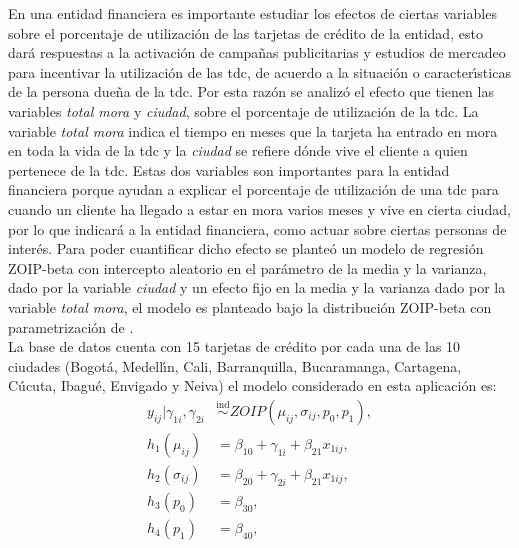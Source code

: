 En una entidad financiera es importante estudiar los efectos de ciertas variables sobre el porcentaje de utilizaci\'{o}n de las tarjetas de cr\'{e}dito de la entidad, esto dar\'{a} respuestas a la activaci\'{o}n de campa\~{n}as publicitarias y estudios de mercadeo para incentivar la utilizaci\'{o}n de las tdc, de acuerdo a la situaci\'{o}n o caracter\'{\i}sticas de la persona due\~{n}a de la tdc. Por esta raz\'{o}n se analiz\'{o} el efecto que tienen las variables \textsl{total mora} y \textsl{ciudad}, sobre el porcentaje de utilizaci\'{o}n de la tdc. La variable \textsl{total mora} indica el tiempo en meses que la tarjeta ha entrado en mora en toda la vida de la tdc y la \textsl{ciudad} se refiere d\'{o}nde vive el cliente a quien pertenece de la tdc. Estas dos variables son importantes para la entidad financiera porque ayudan a explicar el porcentaje de utilizaci\'{o}n de una tdc para cuando un cliente ha llegado a estar en mora varios meses y vive en cierta ciudad, por lo que indicar\'{a} a la entidad financiera, como actuar sobre ciertas personas de inter\'{e}s. Para poder cuantificar dicho efecto se plante\'{o} un modelo de regresi\'{o}n ZOIP-beta con intercepto aleatorio en el par\'{a}metro de la media y la varianza, dado por la variable \textsl{ciudad} y un efecto fijo en la media y la varianza dado por la variable \textsl{total mora}, el modelo es planteado bajo la distribuci\'{o}n ZOIP-beta con parametrizaci\'{o}n de \cite{Stasinopoulos2}.\\

La base de datos cuenta con 15 tarjetas de cr\'{e}dito por cada una de las 10 ciudades (Bogot\'{a}, Medell\'{\i}n, Cali, Barranquilla, Bucaramanga, Cartagena, C\'{u}cuta, Ibagu\'{e}, Envigado y Neiva) el modelo considerado en esta aplicaci\'{o}n es:\\


\begin{equation}
\begin{split}
y_{ij}| \gamma_{1i},\gamma_{2i} &\overset{\text{ind}}{\sim} ZOIP(\mu_{ij},\sigma_{ij},p_0, p_1),\\
h_1(\mu_{ij})&=\beta_{10}+\gamma_{1i}+\beta_{21} x_{1ij},\\
h_2(\sigma_{ij})&=\beta_{20}+\gamma_{2i}+\beta_{21} x_{1ij},\\
h_3(p_{0})&=\beta_{30},\\
h_4(p_{1})&=\beta_{40},
\end{split}
\label{A_eq_reg_mix}
\end{equation}

